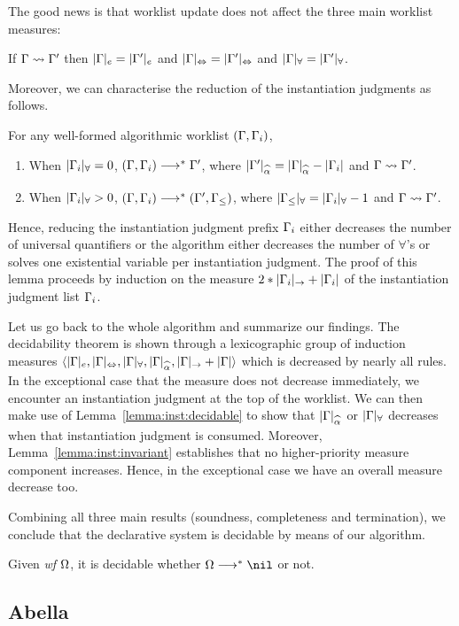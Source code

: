 The good news is that worklist update does not affect the three main worklist measures:
\newcommand{\equivGm}[1]{|\Gm|_{#1} = |\Gm'|_{#1}}\label{lemma:inst:invariant}
\begin{lemma}
If $\Gamma\rightsquigarrow\Gamma'$ then $\equivGm{e}$ and $\equivGm\Leftrightarrow$ and $\equivGm\forall$.
\end{lemma}

Moreover, we can characterise the reduction of the instantiation judgments as follows.
\begin{lemma}\label{lemma:inst:decidable}
For any well-formed algorithmic worklist $(\Gamma, \Gamma_i)$,
\begin{enumerate}[1)]
    \item When $|\Gamma_i|_\forall = 0$, $(\Gamma, \Gamma_i) \longrightarrow^* \Gamma'$,
        where $|\Gm'|_{\al} = |\Gm|_{\al} - |\Gm_i|$ and $\Gamma\rightsquigarrow\Gamma'$.
    \item When $|\Gamma_i|_\forall > 0$, $(\Gamma, \Gamma_i) \longrightarrow^* (\Gamma', \Gamma_\le)$,
        where $|\Gamma_\le|_\forall = |\Gamma_i|_\forall - 1$ and $\Gamma\rightsquigarrow\Gamma'$.
\end{enumerate}
\end{lemma}
Hence, reducing the instantiation judgment prefix $\Gamma_i$ either
decreases the number of universal quantifiers or 
the algorithm either decreases the number of $\forall$'s
or solves one existential variable per instantiation judgment.
The proof of this lemma proceeds by induction on the measure $2*|\Gamma_i|_\to + |\Gamma_i|$
of the instantiation judgment list $\Gamma_i$.

Let us go back to the whole algorithm and summarize our findings.
The decidability theorem is shown through a lexicographic group of induction measures
$\langle |\Gm|_e, |\Gm|_\Leftrightarrow, |\Gm|_\forall, |\Gm|_{\al}, |\Gm|_\to + |\Gm| \rangle$
which is decreased by nearly all rules.
In the exceptional case that the measure does not decrease immediately, 
we encounter an instantiation judgment at the top of the worklist. We can then
make use of Lemma~\ref{lemma:inst:decidable} to show that $|\Gm|_{\al}$ or $|\Gamma|_\forall$ decreases
when that instantiation judgment is consumed. Moreover, Lemma~\ref{lemma:inst:invariant} establishes
that no higher-priority measure component increases. Hence, in the exceptional case we have an overall measure decrease too.

Combining all three main results (soundness, completeness and termination), we conclude that the declarative system is decidable
by means of our algorithm.
\begin{corollary}
Given \emph{wf }$\Omega$, it is decidable whether $\Om\redto\nil$ or not.
\end{corollary}
\subsection{Abella}
